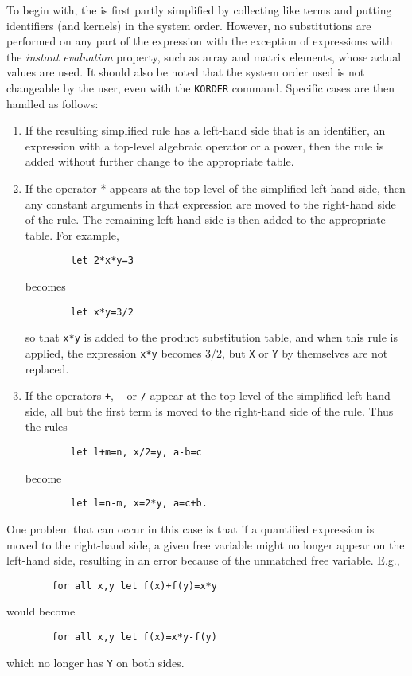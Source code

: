 \documentclass[11pt,letterpaper]{book}
\begin{document}
To begin with, the {\tt <substitution expression>} is first partly
simplified by collecting like terms and putting identifiers (and kernels)
in the system order.  However, no substitutions are performed on any part
of the expression with the exception of expressions with the {\em instant
evaluation\/} property, such as array and matrix elements, whose actual
values are used.  It should also be noted that the system order used is
not changeable by the user, even with the {\tt KORDER} command.  Specific
cases are then handled as follows:
\begin{enumerate}
\item If the resulting simplified rule has a left-hand side that is an
identifier, an expression with a top-level algebraic operator or a power,
then the rule is added without further change to the appropriate table.

\item If the operator * appears at the top level of the simplified left-hand
side, then any constant arguments in that expression are moved to the
right-hand side of the rule.  The remaining left-hand side is then added
to the appropriate table.  For example,
{\small\begin{verbatim}
        let 2*x*y=3
\end{verbatim}}
becomes
{\small\begin{verbatim}
        let x*y=3/2
\end{verbatim}}
so that {\tt x*y} is added to the product substitution table, and when
this rule is applied, the expression {\tt x*y} becomes 3/2, but {\tt X} or
{\tt Y} by themselves are not replaced.

\item If the operators {\tt +}, {\tt -} or {\tt /} appear at the top level
of the simplified left-hand side, all but the first term is moved to the
right-hand side of the rule.  Thus the rules
{\small\begin{verbatim}
        let l+m=n, x/2=y, a-b=c
\end{verbatim}}
become
{\small\begin{verbatim}
        let l=n-m, x=2*y, a=c+b.
\end{verbatim}}
\end{enumerate}
One problem that can occur in this case is that if a quantified expression
is moved to the right-hand side, a given free variable might no longer
appear on the left-hand side, resulting in an error because of the
unmatched free variable. E.g.,
{\small\begin{verbatim}
        for all x,y let f(x)+f(y)=x*y
\end{verbatim}}
would become
{\small\begin{verbatim}
        for all x,y let f(x)=x*y-f(y)
\end{verbatim}}
which no longer has {\tt Y} on both sides.
\end{document}
